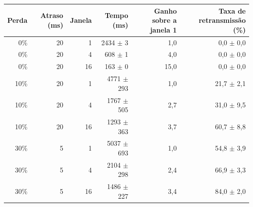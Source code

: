 \begin{tabular}{rrrrrr}
\toprule
Perda & Atraso (ms) & Janela & Tempo (ms) & Ganho sobre a janela 1 & Taxa de retransmiss\~ao (\%) \\
\midrule
0\% & 20 & 1 & 2434 $\pm$ 3 & 1,0 & 0,0 $\pm$ 0,0 \\
0\% & 20 & 4 & 608 $\pm$ 1 & 4,0 & 0,0 $\pm$ 0,0 \\
0\% & 20 & 16 & 163 $\pm$ 0 & 15,0 & 0,0 $\pm$ 0,0 \\
10\% & 20 & 1 & 4771 $\pm$ 293 & 1,0 & 21,7 $\pm$ 2,1 \\
10\% & 20 & 4 & 1767 $\pm$ 505 & 2,7 & 31,0 $\pm$ 9,5 \\
10\% & 20 & 16 & 1293 $\pm$ 363 & 3,7 & 60,7 $\pm$ 8,8 \\
30\% & 5 & 1 & 5037 $\pm$ 693 & 1,0 & 54,8 $\pm$ 3,9 \\
30\% & 5 & 4 & 2104 $\pm$ 298 & 2,4 & 66,9 $\pm$ 3,3 \\
30\% & 5 & 16 & 1486 $\pm$ 227 & 3,4 & 84,0 $\pm$ 2,0 \\
\bottomrule
\end{tabular}
